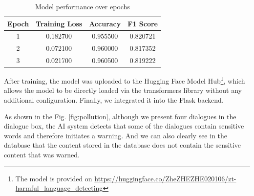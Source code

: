 \documentclass{article}
\begin{document}
\begin{enumerate}
    \begin{table}[htbp]
    \centering
    \caption{Model performance over epochs}
    \begin{tabular}{|c|c|c|c|}
    \hline
    \textbf{Epoch} & \textbf{Training Loss} & \textbf{Accuracy} & \textbf{F1 Score} \\
    \hline
    1 & 0.182700 & 0.955500 & 0.820721 \\
    2 & 0.072100 & 0.960000 & 0.817352 \\
    3 & 0.021700 & 0.960500 & 0.819222 \\
    \hline
    \end{tabular}
    \label{tab:training_metrics}
    \end{table}

After training, the model was uploaded to the Hugging Face Model Hub\footnote{The model is provided on \url{https://huggingface.co/ZheZHEZHE020106/zt-harmful_language_detecting}}, which allows the model to be directly loaded via the transformers library without any additional configuration. Finally, we integrated it into the Flask backend.

As shown in the Fig. \ref{fig:pollution}, although we present four dialogues in the dialogue box, the AI system detects that some of the dialogues contain sensitive words and therefore initiates a warning. 
And we can also clearly see in the database that the content stored in the database does not contain the sensitive content that was warned.


\end{enumerate}
\end{document}
